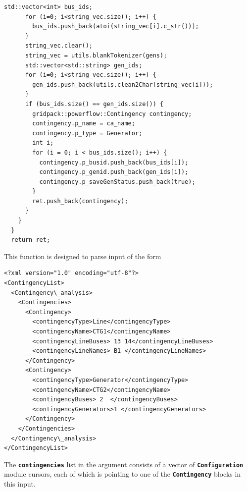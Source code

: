 \documentclass[12pt]{report} %
\begin{document}
{\begin{Verbatim}[fontseries=b]
      std::vector<int> bus_ids;
      for (i=0; i<string_vec.size(); i++) {
        bus_ids.push_back(atoi(string_vec[i].c_str()));
      }
      string_vec.clear();
      string_vec = utils.blankTokenizer(gens);
      std::vector<std::string> gen_ids;
      for (i=0; i<string_vec.size(); i++) {
        gen_ids.push_back(utils.clean2Char(string_vec[i]));
      }
      if (bus_ids.size() == gen_ids.size()) {
        gridpack::powerflow::Contingency contingency;
        contingency.p_name = ca_name;
        contingency.p_type = Generator;
        int i;
        for (i = 0; i < bus_ids.size(); i++) {
          contingency.p_busid.push_back(bus_ids[i]);
          contingency.p_genid.push_back(gen_ids[i]);
          contingency.p_saveGenStatus.push_back(true);
        }
        ret.push_back(contingency);
      }
    }
  }
  return ret;
\end{Verbatim}
}

This function is designed to parse input of the form

{
\color{red}
\begin{Verbatim}[fontseries=b]
<?xml version="1.0" encoding="utf-8"?>
<ContingencyList>
  <Contingency\_analysis>
    <Contingencies>
      <Contingency>
        <contingencyType>Line</contingencyType>
        <contingencyName>CTG1</contingencyName>
        <contingencyLineBuses> 13 14</contingencyLineBuses>
        <contingencyLineNames> B1 </contingencyLineNames>
      </Contingency>
      <Contingency>
        <contingencyType>Generator</contingencyType>
        <contingencyName>CTG2</contingencyName>
        <contingencyBuses> 2  </contingencyBuses>
        <contingencyGenerators>1 </contingencyGenerators>
      </Contingency>
    </Contingencies>
  </Contingency\_analysis>
</ContingencyList>
\end{Verbatim}
}

The \texttt{\textbf{contingencies}} list in the argument consists of a vector of \texttt{\textbf{Configuration}} module cursors, each of which is pointing to one of the \texttt{\textbf{Contingency}} blocks in this input.
\end{document}
